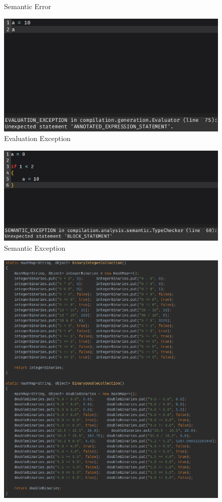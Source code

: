 \documentclass[
]{report}
\begin{document}
\begin{appendices}
\begin{figure}
		\caption{Semantic Error}
		\label{fig:semantic-error}
	\end{figure}
	\begin{figure}
		\centering
		\includegraphics[width=\textwidth]{evaluation-exception}
		\caption{Evaluation Exception}
		\label{fig:evaluation-exception}
	\end{figure}
	\begin{figure}
		\centering
		\includegraphics[width=\textwidth]{semantic-exception}
		\caption{Semantic Exception}
		\label{fig:semantic-exception}
	\end{figure}
	\begin{figure}
		\centering
		\includegraphics[width=\textwidth]{test-data-example}

\end{figure}
\end{appendices}
\end{document}

